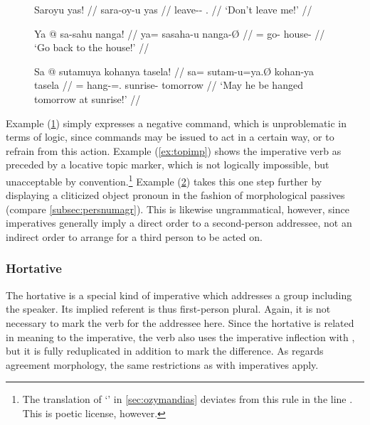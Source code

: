 \begin{figure}[h]
\ex\label{ex:negimp}\begingl
	\gla Saroyu yas! //
	\glb sara-oy-u yas //
	\glc leave-\Neg{}-\Imp{} \Fsg{}.\Parg{} //
	\glft `Don't leave me!' //
\endgl\xe
\end{figure}

\begin{figure}[h]
\pex\label{ex:agrimp}
\a\label{ex:topimp}\ljudge*\begingl
	\gla Ya @ sa-sahu nanga! //
	\glb ya= sa\til{}saha-u nanga-Ø //
	\glc \LocT{}= \Iter{}\til{}go-\Imp{} house-\Top{} //
	\glft `Go back to the house!' //
\endgl

\a\label{ex:persimp}\ljudge*\begingl
	\gla Sa @ sutamuya kohanya tasela! //
	\glb sa= sutam-u=ya.Ø kohan-ya tasela //
	\glc \PatT{}= hang-\Imp{}=\TsgM{}.\Top{} sunrise-\Loc{} tomorrow //
	\glft `May he be hanged tomorrow at sunrise!' //
\endgl
\xe
\end{figure}

Example (\ref{ex:negimp}) simply expresses a negative command, which is
unproblematic in terms of logic, since commands may be issued to act in a
certain way, or to refrain from this action. Example (\ref{ex:topimp}) shows
the imperative verb as preceded by a locative topic marker, which is not
logically impossible, but unacceptable by convention.\footnote{The translation
of `' in \autoref{sec:ozymandias} deviates from
this rule in the line . This is poetic license, however.} Example (\ref{ex:persimp})
takes this one step further by displaying a cliticized object pronoun in the
fashion of morphological passives (compare \autoref{subsec:persnumagr}). This
is likewise ungrammatical, however, since imperatives generally imply a direct
order to a second-person addressee, not an indirect order to arrange for a
third person to be acted on.


\subsubsection{Hortative}

The hortative is a special kind of imperative which addresses a group 
including the speaker. Its implied referent is thus first-person plural. 
Again, it is not necessary to mark the verb for the addressee here. Since 
the hortative is related in meaning to the imperative, the verb also uses the 
imperative inflection with , but it is fully reduplicated in 
addition to mark the difference. As regards agreement morphology, the same 
restrictions as with imperatives apply.

